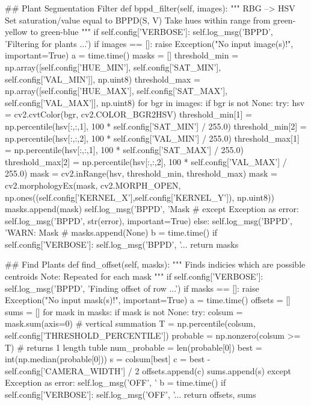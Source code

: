 \begin{python}
        
    ## Plant Segmentation Filter
    def bppd_filter(self, images):    
        """
        RBG --> HSV
        Set saturation/value equal to BPPD(S, V)
        Take hues within range from green-yellow to green-blue
        """
        if self.config['VERBOSE']: self.log_msg('BPPD', 'Filtering for plants ...')
        if images == []: raise Exception("No input image(s)!", important=True)
        a = time.time()
        masks = []
        threshold_min = np.array([self.config['HUE_MIN'], self.config['SAT_MIN'], self.config['VAL_MIN']], np.uint8)
        threshold_max = np.array([self.config['HUE_MAX'], self.config['SAT_MAX'], self.config['VAL_MAX']], np.uint8)
        for bgr in images:
            if bgr is not None:
                try:
                    hsv = cv2.cvtColor(bgr, cv2.COLOR_BGR2HSV)
                    threshold_min[1] = np.percentile(hsv[:,:,1], 100 * self.config['SAT_MIN'] / 255.0)
                    threshold_min[2] = np.percentile(hsv[:,:,2], 100 * self.config['VAL_MIN'] / 255.0)
                    threshold_max[1] = np.percentile(hsv[:,:,1], 100 * self.config['SAT_MAX'] / 255.0)
                    threshold_max[2] = np.percentile(hsv[:,:,2], 100 * self.config['VAL_MAX'] / 255.0)
                    mask = cv2.inRange(hsv, threshold_min, threshold_max)
                    mask = cv2.morphologyEx(mask, cv2.MORPH_OPEN, np.ones((self.config['KERNEL_X'],self.config['KERNEL_Y']), np.uint8))
                    masks.append(mask)
                    self.log_msg('BPPD', 'Mask #%
                except Exception as error:
                    self.log_msg('BPPD', str(error), important=True)
            else:
                self.log_msg('BPPD', 'WARN: Mask #%
                masks.append(None)
        b = time.time()
        if self.config['VERBOSE']: self.log_msg('BPPD', '... %
        return masks
        
    ## Find Plants
    def find_offset(self, masks):
        """
        Finds indicies which are possible centroids
        Note: Repeated for each mask
        """
        if self.config['VERBOSE']: self.log_msg('BPPD', 'Finding offset of row ...')
        if masks == []: raise Exception("No input mask(s)!", important=True)
        a = time.time()
        offsets = []
        sums = []
        for mask in masks:
            if mask is not None:
                try:
                    colsum = mask.sum(axis=0) # vertical summation
                    T = np.percentile(colsum, self.config['THRESHOLD_PERCENTILE'])
                    probable = np.nonzero(colsum >= T) # returns 1 length tuble
                    num_probable = len(probable[0])
                    best = int(np.median(probable[0]))
                    s = colsum[best]
                    c = best - self.config['CAMERA_WIDTH'] / 2
                    offsets.append(c)
                    sums.append(s)
                except Exception as error:
                    self.log_msg('OFF', '%
        b = time.time()
        if self.config['VERBOSE']: self.log_msg('OFF', '... %
        return offsets, sums
        

\end{python}
